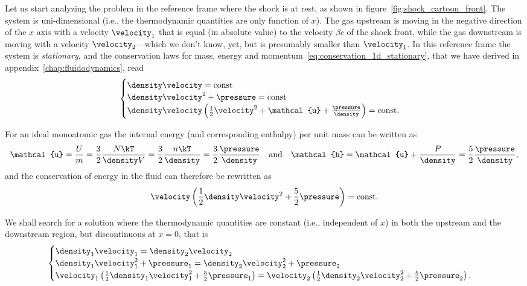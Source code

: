 Let us start analyzing the problem in the reference frame where the shock is at rest,
as shown in figure~\ref{fig:shock_cartoon_front}. The system is uni-dimensional
(i.e., the thermodynamic quantities are only function of $x$). The gas upstream
is moving in the negative direction of the $x$ axis with a velocity $\velocity_1$ that is
equal (in absolute value) to the velocity $\beta c$ of the shock front, while the gas
downstream is moving with a velocity $\velocity_2$---which we don't know, yet, but is presumably
smaller than $\velocity_1$. In this reference frame the system is \emph{stationary}, and
the conservation laws for mass, energy and momentum~\eqref{eq:conservation_1d_stationary},
that we have derived in appendix~\ref{chap:fluidodynamics}, read
\begin{align*}
  \begin{cases}
  \density \velocity = \text{const}\\
  \density \velocity^2 + \pressure = \text{const}\\
  \density \velocity \left( \frac{1}{2}\velocity^2 + \mathcal{u} +
    \frac{\pressure}{\density} \right) = \text{const}.
  \end{cases}
\end{align*}

For an ideal monoatomic gas the internal energy (and corresponding enthalpy) per
unit mass can be written as
\begin{align*}
  \mathcal{u} = \frac{U}{m} = \frac{3}{2} \frac{N\kT}{\density V} =
  \frac{3}{2} \frac{n\kT}{\density} = \frac{3}{2} \frac{\pressure}{\density}
  \quad \text{and} \quad
  \mathcal{h} = \mathcal{u} + \frac{P}{\density} =
  \frac{5}{2} \frac{\pressure}{\density},
\end{align*}
and the conservation of energy in the fluid can therefore be rewritten as
\begin{align*}
  \velocity \left( \frac{1}{2}\density \velocity^2 + \frac{5}{2}\pressure \right)= \text{const}.
\end{align*}

We shall search for a solution where the thermodynamic quantities are constant
(i.e., independent of $x$) in both the upstream and the downstream region, but
discontinuous at $x = 0$, that is
\begin{align}
  \begin{cases}
  \density_1 \velocity_1 =  \density_2 \velocity_2\\
  \density_1 \velocity_1^2 + \pressure_1 = \density_2 \velocity_2^2 + \pressure_2\\
  \velocity_1 \left( \frac{1}{2}\density_1 \velocity_1^2 + \frac{5}{2}\pressure_1 \right) =
  \velocity_2 \left( \frac{1}{2}\density_2 \velocity_2^2 + \frac{5}{2}\pressure_2 \right).
  \end{cases}
\end{align}

